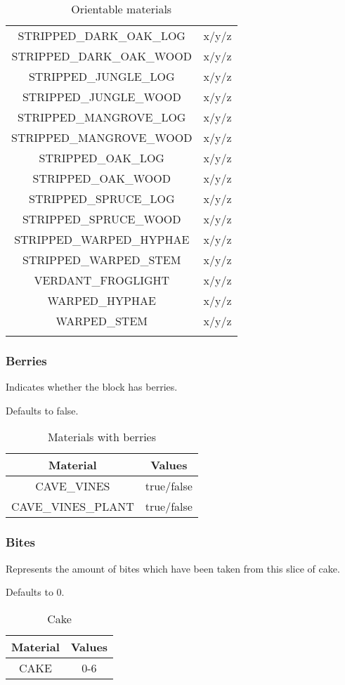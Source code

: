 \begin{longtable}{ |c|c| }
	STRIPPED\_DARK\_OAK\_LOG & x/y/z \\
	STRIPPED\_DARK\_OAK\_WOOD & x/y/z \\
	STRIPPED\_JUNGLE\_LOG & x/y/z \\
	STRIPPED\_JUNGLE\_WOOD & x/y/z \\
	STRIPPED\_MANGROVE\_LOG & x/y/z \\
	STRIPPED\_MANGROVE\_WOOD & x/y/z \\
	STRIPPED\_OAK\_LOG & x/y/z \\
	STRIPPED\_OAK\_WOOD & x/y/z \\
	STRIPPED\_SPRUCE\_LOG & x/y/z \\
	STRIPPED\_SPRUCE\_WOOD & x/y/z \\
	STRIPPED\_WARPED\_HYPHAE & x/y/z \\
	STRIPPED\_WARPED\_STEM & x/y/z \\
	VERDANT\_FROGLIGHT & x/y/z \\
	WARPED\_HYPHAE & x/y/z \\
	WARPED\_STEM & x/y/z \\
	\hline
	\caption{Orientable materials}
\end{longtable}

\subsubsection{Berries}
Indicates whether the block has berries.

Defaults to false.

\begin{table}[H]
	\centering
	\begin{tabular}{ |c|c| }
		\hline
		Material & Values \\
		\hline
		CAVE\_VINES & true/false \\
		CAVE\_VINES\_PLANT & true/false \\
		\hline
	\end{tabular}
	\caption{Materials with berries}
\end{table}

\subsubsection{Bites}
Represents the amount of bites which have been taken from this slice of cake.

Defaults to 0.

\begin{table}[H]
	\centering
	\begin{tabular}{ |c|c| }
		\hline
		Material & Values \\
		\hline
		CAKE & 0-6 \\
		\hline
	\end{tabular}
	\caption{Cake}
\end{table}

